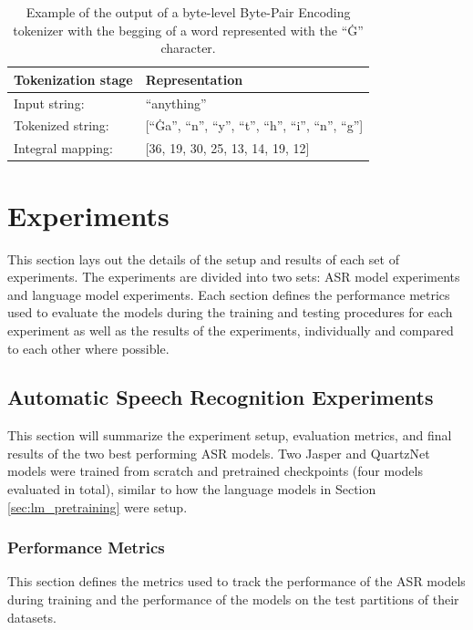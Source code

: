 \documentclass[12pt]{article}
\begin{document}
\begin{table}[!t]
    \centering
    \begin{tabular}{l l}
        \toprule
        Tokenization stage & Representation                                            \\
        \midrule
        Input string:      & ``anything''                                              \\
        Tokenized string:  & [``Ġa'', ``n'', ``y'', ``t'', ``h'', ``i'', ``n'', ``g''] \\
        Integral mapping:  & [36, 19, 30, 25, 13, 14, 19, 12]                          \\
        \bottomrule
    \end{tabular}
    \caption{Example of the output of a byte-level Byte-Pair Encoding tokenizer with the begging of a word represented with the ``Ġ'' character.}
    \label{tab:byte_level_bpe_example}
\end{table}

\section{Experiments}\label{sec:experiments}
This section lays out the details of the setup and results of each set of experiments. The experiments are divided into two sets: ASR model
experiments and language model experiments. Each section defines the performance metrics used to evaluate the models during the training and testing
procedures for each experiment as well as the results of the experiments, individually and compared to each other where possible.

\subsection{Automatic Speech Recognition Experiments}\label{sec:asr_experiments}
This section will summarize the experiment setup, evaluation metrics, and final results of the two best performing ASR models. Two Jasper and
QuartzNet models were trained from scratch and pretrained checkpoints (four models evaluated in total), similar to how the language models in Section
\ref{sec:lm_pretraining} were setup.

\subsubsection{Performance Metrics}\label{sec:asr_performance_metrics}
This section defines the metrics used to track the performance of the ASR models during training and the performance of the models on the test
partitions of their datasets.
\end{document}
